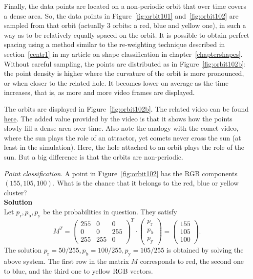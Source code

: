 \documentclass[oneside,10pt]{book}
\newcommand{\qed}{\nobreak \ifvmode \relax \else
      \ifdim\lastskip<1.5em \hskip-\lastskip
      \hskip1.5em plus0em minus0.5em \fi \nobreak
      \vrule height0.75em width0.5em depth0.25em\fi}
\begin{document}
Finally, the data points are located on a non-periodic orbit that over time covers a dense area. So, the data points in Figure~\ref{fig:orbit101}
and~\ref{fig:orbit102} are sampled from that orbit (actually 3 orbits: a red, blue and yellow one), in such a way as to be relatively equally spaced on the orbit.
It is possible to obtain perfect spacing using a method similar to the re-weighting technique described in section~\ref{centr1}  in my article on shape classification in chapter~\ref{chaptershapes}. Without careful sampling, the points are distributed as in Figure~\ref{fig:orbit102b}: the point density is higher where the curvature of the orbit is more pronounced, or when closer to the related hole. It becomes lower on average as the time increases, that is, as more and more video frames are displayed.

The orbits are displayed in Figure~\ref{fig:orbit102b}. The related video can be found \href{https://www.youtube.com/watch?v=aub5am1YjIs}{here}. The added value provided by the video is that it shows how the points slowly fill a dense area over time. Also note the analogy with the comet video, where the sun plays the role of an attractor, yet comets never cross the sun (at least in the simulation). Here, the hole attached to an orbit plays the role of the sun.
But a big difference is that the orbits are non-periodic.


\begin{Exercise}\label{exqwas}{\em Point classification}. A point in Figure~\ref{fig:orbit102} has the RGB components $(155,105,100)$. What is the
chance that it belongs to the red, blue or yellow cluster? \vspace{1ex} \\
{\bf Solution} \vspace{1ex} \\
Let $p_\text{r},p_\text{b},p_\text{y}$ be the probabilities in question. They satisfy
$$M^T=
\left(
\begin{array}{rrr}
 255 & 0 & 0 \\
 0 & 0 & 255 \\
 255 & 255 & 0
\end{array}
\right)^T \cdot
\left(
\begin{array}{r}
p_\text{r} \\
p_\text{b} \\
p_\text{y}
\end{array}
\right)=
\left(
\begin{array}{r}
155 \\
105 \\
100
\end{array}
\right).
$$
The solution $p_\text{r}=50/255,p_\text{b}=100/255,p_\text{y}=105/255$ is obtained by solving the above system. The first row in the matrix $M$ corresponds to red, the second one to blue, and the third one to yellow RGB vectors. \qed
\end{Exercise}
\end{document}
